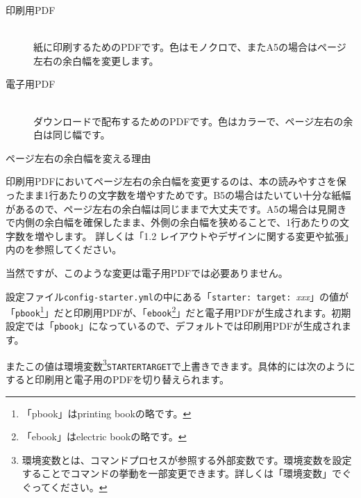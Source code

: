 \begin{description}
\item[印刷用PDF] \mbox{} \\
紙に印刷するためのPDFです。色はモノクロで、またA5の場合はページ左右の余白幅を変更します。
\item[電子用PDF] \mbox{} \\
ダウンロードで配布するためのPDFです。色はカラーで、ページ左右の余白は同じ幅です。
\end{description}

\begin{starternote}{ページ左右の余白幅を変える理由}
\begin{starternoteinner}

印刷用PDFにおいてページ左右の余白幅を変更するのは、本の読みやすさを保ったまま1行あたりの文字数を増やすためです。B5の場合はたいてい十分な紙幅があるので、ページ左右の余白幅は同じままで大丈夫です。A5の場合は見開きで内側の余白幅を確保したまま、外側の余白幅を狭めることで、1行あたりの文字数を増やします。
詳しくは「1.2 レイアウトやデザインに関する変更や拡張」内のを参照してください。

当然ですが、このような変更は電子用PDFでは必要ありません。

\end{starternoteinner}
\end{starternote}

設定ファイル\texttt{config{-}starter.yml}の中にある「\texttt{starter: target: }\textit{xxx}」の値が「\texttt{pbook}\footnote{「pbook」はprinting bookの略です。}」だと印刷用PDFが、「\texttt{ebook}\footnote{「ebook」はelectric bookの略です。}」だと電子用PDFが生成されます。初期設定では「\texttt{pbook}」になっているので、デフォルトでは印刷用PDFが生成されます。

またこの値は環境変数\footnote{環境変数とは、コマンドプロセスが参照する外部変数です。環境変数を設定することでコマンドの挙動を一部変更できます。詳しくは「環境変数」でぐぐってください。}\texttt{\textdollar{}STARTER\textunderscore{}TARGET}で上書きできます。具体的には次のようにすると印刷用と電子用のPDFを切り替えられます。

\label{}
\begin{starterterminal}\end{starterterminal}


